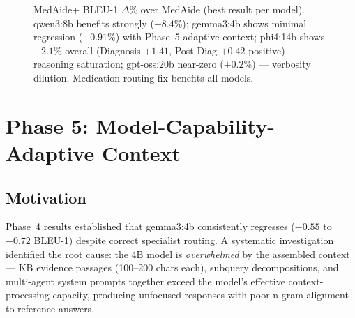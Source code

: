 \documentclass[conference]{IEEEtran}
\begin{document}
\begin{figure}[t]
\centering
{}
\caption{MedAide+ BLEU-1 $\Delta$\% over MedAide (best result per model). qwen3:8b benefits strongly ($+8.4$\%); gemma3:4b shows minimal regression ($-0.91$\%) with Phase~5 adaptive context; phi4:14b shows $-2.1$\% overall (Diagnosis $+1.41$, Post-Diag $+0.42$ positive) — reasoning saturation; gpt-oss:20b near-zero ($+0.2$\%) — verbosity dilution. Medication routing fix benefits all models.}
\label{fig:barchart}
\end{figure}

\section{Phase 5: Model-Capability-Adaptive Context}
\label{sec:phase5}

\subsection{Motivation}

Phase~4 results established that gemma3:4b consistently regresses ($-0.55$ to $-0.72$ BLEU-1) despite correct specialist routing. A systematic investigation identified the root cause: the 4B model is \textit{overwhelmed} by the assembled context — KB evidence passages (100--200 chars each), subquery decompositions, and multi-agent system prompts together exceed the model's effective context-processing capacity, producing unfocused responses with poor n-gram alignment to reference answers.
\end{document}
